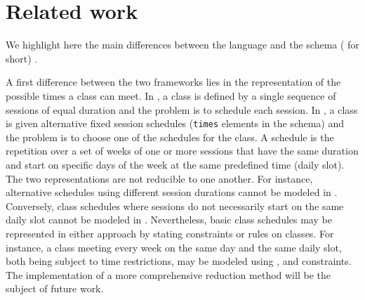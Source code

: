 \section{Related work}
\label{sec:related-work}

We highlight here the main differences between the {\UTP} language and the {\ITC} schema ({\ITC} for short) \cite{2018muller,ITC2019}.

A first difference between the two frameworks lies in the representation of the possible times a class can meet.
In {\UTP}, a class is defined by a single sequence of sessions of equal duration and the problem is to schedule each session.
In {\ITC}, a class is given alternative fixed session schedules ({\texttt{times}} elements in the {\XML} schema) and the problem is to choose one of the schedules for the class.
A schedule is the repetition over a set of weeks of one or more sessions that have the same duration and start on specific days of the week at the same predefined time (daily slot).
The two representations are not reducible to one another.
For instance, alternative schedules using different session durations cannot be modeled in {\UTP}.
Conversely, class schedules where sessions do not necessarily start on the same daily slot cannot be modeled in {\ITC}.
Nevertheless, basic class schedules may be represented in either approach by stating {\ITC} constraints or {\UTP} rules on classes.
For instance, a class meeting every week on the same day and the same daily slot, both being subject to time restrictions, may be modeled using \texttt{\SAMEDAILYSLOT}, \texttt{\WEEKLY} and \texttt{\FORBIDDENPERIOD} constraints.
The implementation of a more comprehensive reduction method %
will be the subject of future work.

